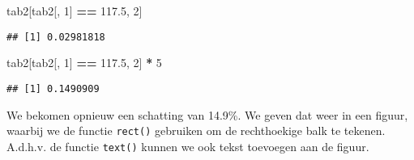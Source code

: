 \documentclass[12pt,dutch,coursenotes]{book}
\newenvironment{Shaded}{\begin{snugshade}}{\end{snugshade}}
\newcommand{\KeywordTok}[1]{\textcolor[rgb]{0.13,0.29,0.53}{\textbf{#1}}}
\newcommand{\DataTypeTok}[1]{\textcolor[rgb]{0.13,0.29,0.53}{#1}}
\newcommand{\DecValTok}[1]{\textcolor[rgb]{0.00,0.00,0.81}{#1}}
\newcommand{\FloatTok}[1]{\textcolor[rgb]{0.00,0.00,0.81}{#1}}
\newcommand{\StringTok}[1]{\textcolor[rgb]{0.31,0.60,0.02}{#1}}
\newcommand{\OtherTok}[1]{\textcolor[rgb]{0.56,0.35,0.01}{#1}}
\newcommand{\OperatorTok}[1]{\textcolor[rgb]{0.81,0.36,0.00}{\textbf{#1}}}
\newcommand{\NormalTok}[1]{#1}
\theoremstyle{definition}
\theoremstyle{definition}
\theoremstyle{definition}
\theoremstyle{remark}
\begin{document}
\begin{Shaded}
\begin{Highlighting}[]
\NormalTok{tab2[tab2[, }\DecValTok{1}\NormalTok{] }\OperatorTok{==}\StringTok{ }\FloatTok{117.5}\NormalTok{, }\DecValTok{2}\NormalTok{]}
\end{Highlighting}
\end{Shaded}

\begin{verbatim}
## [1] 0.02981818
\end{verbatim}

\begin{Shaded}
\begin{Highlighting}[]
\NormalTok{tab2[tab2[, }\DecValTok{1}\NormalTok{] }\OperatorTok{==}\StringTok{ }\FloatTok{117.5}\NormalTok{, }\DecValTok{2}\NormalTok{] }\OperatorTok{*}\StringTok{ }\DecValTok{5}
\end{Highlighting}
\end{Shaded}

\begin{verbatim}
## [1] 0.1490909
\end{verbatim}

We bekomen opnieuw een schatting van 14.9\%. We geven dat weer in een
figuur, waarbij we de functie \texttt{rect()} gebruiken om de
rechthoekige balk te tekenen. A.d.h.v. de functie \texttt{text()} kunnen
we ook tekst toevoegen aan de figuur.

\begin{Shaded}
\end{Shaded}
\end{document}
